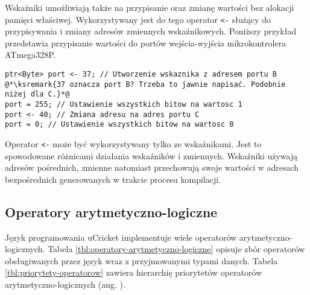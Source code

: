 Wskaźniki umożliwiają także na przypisanie oraz zmianę wartości bez alokacji pamięci właściwej. Wykorzystywany jest do tego operator \lstinline|<-| służący do przypisywania i zmiany adresów zmiennych wskaźnikowych. Poniższy przykład przedstawia przypisanie wartości do portów wejścia-wyjścia mikrokontrolera ATmega328P.
\begin{lstlisting}
ptr<Byte> port <- 37; // Utworzenie wskaznika z adresem portu B @*\ksremark{37 oznacza port B? Trzeba to jawnie napisać. Podobnie niżej dla C.}*@
port = 255; // Ustawienie wszystkich bitow na wartosc 1
port <- 40; // Zmiana adresu na adres portu C
port = 0; // Ustawienie wszystkich bitow na wartosc 0
\end{lstlisting}
Operator \lstinline|<-| może być wykorzystywany tylko ze wskaźnikami. Jest to spowodowane różnicami działania wskaźników i zmiennych. Wskaźniki używają adresów pośrednich, zmienne natomiast przechowują swoje wartości w adresach bezpośrednich generowanych w trakcie procesu kompilacji.

\subsection{Operatory arytmetyczno-logiczne}
Język programowania uCricket implementuje wiele operatorów aryt\-me\-ty\-cz\-no-lo\-gi\-cz\-nych. Tabela \ref{tbl:operatory-arytmetyczno-logiczne} opisuje zbór operatorów obsługiwanych przez język wraz z przyjmowanymi typami danych. Tabela \ref{tbl:priorytety-operatorow} zawiera hierarchię priorytetów operatorów arytmetyczno-logicznych (ang. ). 

